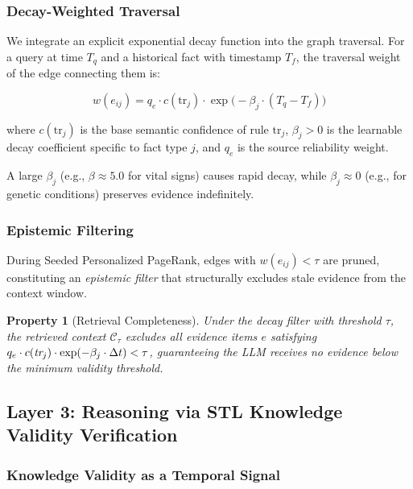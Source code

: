 \documentclass[conference]{IEEEtran}
\newtheorem{property}{Property}
\begin{document}
\subsubsection{Decay-Weighted Traversal}

We integrate an explicit exponential decay function into the graph traversal. For a query at time $T_q$ and a historical fact with timestamp $T_f$, the traversal weight of the edge connecting them is:

\begin{equation}
    w(e_{ij}) = q_e \cdot c(\text{tr}_j) \cdot \exp\!\big(-\beta_j \cdot (T_q - T_f)\big)
    \label{eq:decay}
\end{equation}

\noindent where $c(\text{tr}_j)$ is the base semantic confidence of rule $\text{tr}_j$, $\beta_j > 0$ is the learnable decay coefficient specific to fact type $j$, and $q_e$ is the source reliability weight.

A large $\beta_j$ (e.g., $\beta \approx 5.0$ for vital signs) causes rapid decay, while $\beta_j \approx 0$ (e.g., for genetic conditions) preserves evidence indefinitely.

\subsubsection{Epistemic Filtering}

During Seeded Personalized PageRank, edges with $w(e_{ij}) < \tau$ are pruned, constituting an \emph{epistemic filter} that structurally excludes stale evidence from the context window.

\begin{property}[Retrieval Completeness]
Under the decay filter with threshold $\tau$, the retrieved context $\mathcal{C}_\tau$ excludes all evidence items $e$ satisfying $q_e \cdot c(\emph{tr}_j) \cdot \exp(-\beta_j \cdot \Delta t) < \tau$, guaranteeing the LLM receives no evidence below the minimum validity threshold.
\end{property}

\subsection{Layer 3: Reasoning via STL Knowledge Validity Verification}

\subsubsection{Knowledge Validity as a Temporal Signal}
\end{document}
